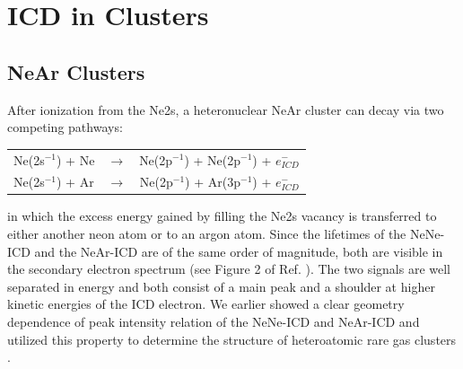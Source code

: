 \section{ICD in Clusters}
\label{sec:clusters}

\subsection{NeAr Clusters}
\label{sec:near}
After ionization from the Ne2s, a heteronuclear NeAr cluster can decay
via two competing pathways:

\begin{center}
\begin{tabular}{lcr}
 Ne(2s$^{-1}$) + Ne &$\rightarrow$ & Ne(2p$^{-1}$) + Ne(2p$^{-1}$) + $e^-_{ICD}$\\
 Ne(2s$^{-1}$) + Ar &$\rightarrow$ & Ne(2p$^{-1}$) + Ar(3p$^{-1}$) + $e^-_{ICD}$
\end{tabular}
\end{center}

in which the excess energy gained by filling the Ne2s vacancy is transferred to
either another neon atom or to an argon atom. Since the lifetimes of the
NeNe-ICD and the NeAr-ICD are of the same order of magnitude, both are
visible in the secondary electron spectrum (see Figure 2 of
Ref. \cite{Fasshauer14_1}). The two signals are well separated in energy
and both consist of a main peak and a shoulder at higher kinetic energies
of the ICD electron.
We earlier showed a clear
geometry dependence of peak intensity relation of the NeNe-ICD and NeAr-ICD
and utilized this property to determine the structure of
heteroatomic rare gas clusters \cite{Fasshauer14_1}.

